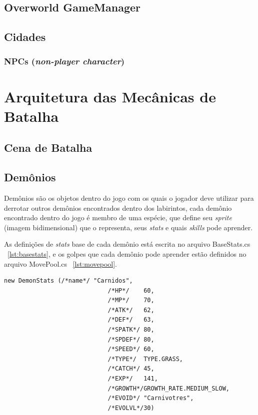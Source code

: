 \documentclass[
	12pt,				%
	openright,			%
	twoside,			%
	a4paper,			%
	english,			%
	french,				%
	spanish,			%
	brazil				%
	]{abntex2}
\begin{document}
\subsection{Overworld GameManager}

\subsection{Cidades}

\subsubsection{NPCs (\emph{non-player character})}

\section{Arquitetura das Mecânicas de Batalha}

\subsection{Cena de Batalha}

\subsection{Demônios}

	Demônios são os objetos dentro do jogo com os quais o jogador deve utilizar para derrotar outros demônios encontrados dentro dos labirintos, cada demônio encontrado dentro do jogo é membro de uma espécie, que define seu \emph{sprite} (imagem bidimensional) que o representa, seus \emph{stats} e quais \emph{skills} pode aprender.
	
	As definições de \emph{stats} base de cada demônio está escrita no arquivo BaseStats.cs ~\ref{lst:basestats}, e os golpes que cada demônio pode aprender estão definidos no arquivo MovePool.cs ~\ref{lst:movepool}.
	

	
\begin{lstlisting}
new DemonStats (/*name*/ "Carnidos",
                             /*HP*/    60,
                             /*MP*/    70, 
                             /*ATK*/   62, 
                             /*DEF*/   63, 
                             /*SPATK*/ 80, 
                             /*SPDEF*/ 80, 
                             /*SPEED*/ 60,
                             /*TYPE*/  TYPE.GRASS,
                             /*CATCH*/ 45,
                             /*EXP*/   141,
                             /*GROWTH*/GROWTH_RATE.MEDIUM_SLOW,
                             /*EVOID*/ "Carnivotres",
                             /*EVOLVL*/30)
\end{lstlisting}
\end{document}
